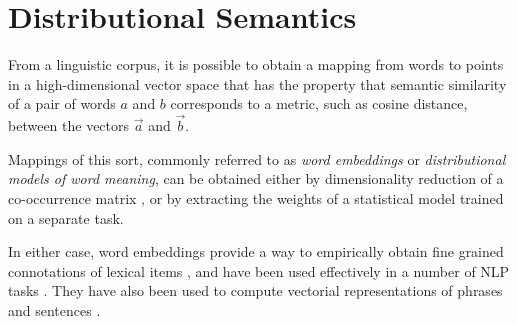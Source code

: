 \documentclass[OpenMind]{stjour}
\begin{document}
\section{Distributional Semantics} \label{distmods}

	From a linguistic corpus, it is possible to obtain a mapping from words to points in a high-dimensional vector space that has the property that semantic similarity of a pair of words $a$ and $b$ corresponds to a metric, such as cosine distance, between the vectors $\overrightarrow{a}$ and $\overrightarrow{b}$.

	Mappings of this sort, commonly referred to as \emph{word embeddings} or \emph{distributional models of word meaning}, can be obtained either by dimensionality reduction of a co-occurrence matrix \citep{pennington2014glove}, or by extracting the weights of a statistical model \citep{mikolov2013distributed,peters2018deep,devlin2018bert} trained on a separate task.

	In either case, word embeddings provide a way to empirically obtain fine grained connotations of lexical items \citep{mikolov2013distributed}, and have been used effectively in a number of NLP tasks \citep{dai2015semi,radford2018improving}. They have also been used to compute vectorial representations of phrases and sentences \citep{socher2013recursive, coecke2010mathematical}.

\end{document}
